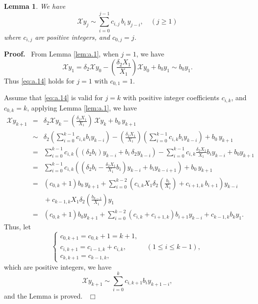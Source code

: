 \documentclass[preprint,12pt]{elsarticle}
\newtheorem{lem}[thm]{Lemma}
\newenvironment{proof}[1][Proof]{\textbf{#1.}\ }{\ $\Box$}
\begin{document}
\begin{lem}
\label{lem:a.2} We have
\begin{equation} \label{eq:a.14} 
\mathscr{X}y_j \sim
\sum_{i = 0}^{j-1}c_{i,j}\,b_i\,y_{j-i},\quad (j\geq 1)
\end{equation}
 where $c_{i,j}$ are positive integers, and $c_{0,j} = j$.
\end{lem}
\begin{proof} From Lemma \ref{lem:a.1}, when $j = 1$, we have
$$
\mathscr{X}y_1 = \delta_2\mathscr{X}y_0 - (\frac{\delta_2 X_1}{X_1})\mathscr{X}y_0 + b_0 y_1 \sim b_0 y_1.
$$
Thus \eqref{eq:a.14} holds for $j=1$ with $c_{0,1} = 1$. 

Assume that \eqref{eq:a.14} is valid for $j = k$ with positive integer coefficients $c_{i,k}$, and $c_{0,k}=k$, applying
 Lemma \ref{lem:a.1}, we have
\begin{eqnarray*}
\mathscr{X}y_{k+1} &=& \delta_2\mathscr{X}y_k - (\frac{\delta_2
X_1}{X_1})\,\mathscr{X}y_k + b_0\,y_{k+1}\\
&\sim&\delta_2(\sum_{i=0}^{k-1}c_{i,k}b_i y_{k-i}) -
(\frac{\delta_2 X_1}{X_1}) (\sum_{i=0}^{k-1}c_{i,k}b_i y_{k-i}) + b_0\,y_{k+1}\\
&=&\sum_{i=0}^{k-1}c_{i,k} ((\delta_2b_i) y_{k-i} + b_i\,\delta_2y_{k-i}) -
\sum_{i=0}^{k-1}c_{i,k}\frac{\delta_2 X_1}{X_1} b_i y_{k-i} + b_0y_{k+1}\\
&=&\sum_{i=0}^{k-1}c_{i,k}\left((\delta_2b_i - \frac{\delta_2
X_1}{X_1} b_i) y_{k-i} + b_i y_{k-i+1}\right) + b_0\,y_{k+1}\\
&=&(c_{0,k} + 1) b_0\,y_{k+1} + \sum_{i = 0}^{k-2}\left(c_{i,k}
X_1 \delta_2(\frac{b_i}{X_1}) + c_{i+1,k}\,b_{i+1}\right)y_{k-i}\\
&&{} + c_{k-1,k} X_1\delta_2(\frac{b_{k-1}}{X_1}) y_1\\
&=&(c_{0,k} + 1) b_0 y_{k+1} + \sum_{i = 0}^{k-2}(c_{i, k}
 + c_{i+1, k}) b_{i+1}y_{k-i} + c_{k-1, k} b_{k} y_1.
\end{eqnarray*}
Thus, let
$$\left\{\begin{array}{ll}
c_{0,k+1} = c_{0,k} + 1 = k+1,& \\
c_{i,k+1} = c_{i-1,k} + c_{i,k},&\ \ (1\leq i\leq k-1),\\
c_{k,k+1} = c_{k-1,k},&
\end{array}\right.$$
which are positive integers,  we have 
$$\mathscr{X}y_{k+1} \sim  \sum_{i = 0}^kc_{i,k+1} b_i y_{k + 1 - i},$$
and the  Lemma is proved.
\end{proof}
\end{document}
